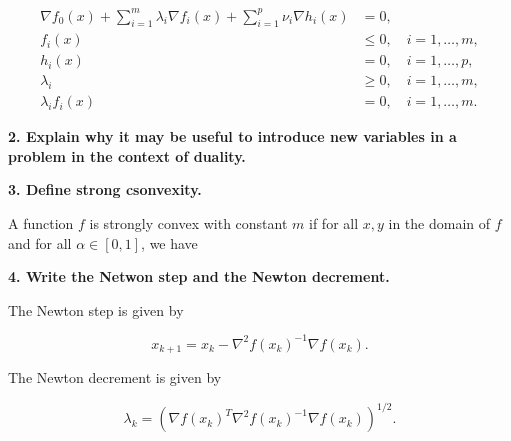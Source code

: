 $$
\begin{aligned}
\nabla f_0(x) + \sum_{i=1}^m \lambda_i \nabla f_i(x) + \sum_{i=1}^p \nu_i \nabla h_i(x) &= 0, \\
f_i(x) &\leq 0, \quad i = 1, \ldots, m, \\
h_i(x) &= 0, \quad i = 1, \ldots, p, \\
\lambda_i &\geq 0, \quad i = 1, \ldots, m, \\
\lambda_i f_i(x) &= 0, \quad i = 1, \ldots, m.
\end{aligned}
$$

\noindent\textbf{2. \; Explain why it may be useful to introduce new variables in a problem in the context of duality.}



\noindent\textbf{3. \; Define strong csonvexity.}

A function $f$ is strongly convex with constant $m$ if for all $x, y$ in the domain of $f$ and for all $\alpha \in [0, 1]$, we have

\noindent\textbf{4. \; Write the Netwon step and the Newton decrement.}

The Newton step is given by

$$
x_{k+1} = x_k - \nabla^2 f(x_k)^{-1} \nabla f(x_k).
$$

The Newton decrement is given by

$$
\lambda_k = \left( \nabla f(x_k)^T \nabla^2 f(x_k)^{-1} \nabla f(x_k) \right)^{1/2}.
$$
